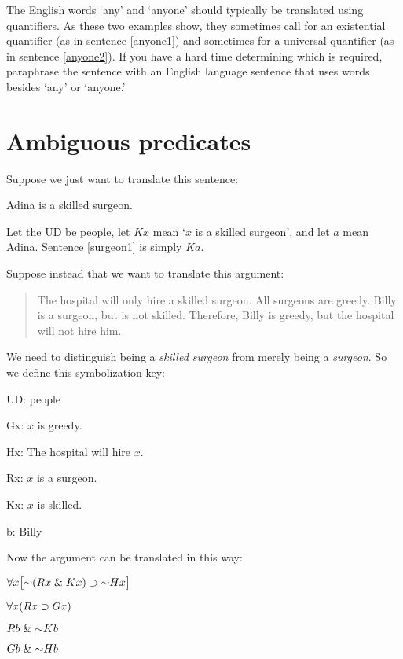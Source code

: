 The English words `any' and `anyone' should typically be translated using quantifiers. As these two examples show, they sometimes call for an existential quantifier (as in sentence \ref{anyone1}) and sometimes for a universal quantifier (as in sentence \ref{anyone2}). If you have a hard time determining which is required, paraphrase the sentence with an English language sentence that uses words besides `any' or `anyone.'



\section{Ambiguous predicates}

Suppose we just want to translate this sentence:
\begin{earg}
\item[\ex{surgeon1}] Adina is a skilled surgeon.
\end{earg}
Let the UD be people, let $Kx$ mean `$x$ is a skilled surgeon', and let $a$ mean Adina. Sentence \ref{surgeon1} is simply $Ka$.


Suppose instead that we want to translate this argument:
\begin{quote}
The hospital will only hire a skilled surgeon. All surgeons are greedy. Billy is a surgeon, but is not skilled. Therefore, Billy is greedy, but the hospital will not hire him.
\end{quote}
We need to distinguish being a \emph{skilled surgeon} from merely being a \emph{surgeon}. So we define this symbolization key:
\begin{ekey}
\item[UD:] people
\item[Gx:] $x$ is greedy.
\item[Hx:] The hospital will hire $x$.
\item[Rx:] $x$ is a surgeon.
\item[Kx:] $x$ is skilled.
\item[b:] Billy
\end{ekey}

Now the argument can be translated in this way:
\begin{earg}
\label{surgeon2}
\item[] $\qt{\forall}{x}\bigl[\enot (Rx \eand Kx) \eif \enot Hx\bigr]$
\item[] $\forall x(Rx \supset Gx)$
\item[] $Rb \eand \enot Kb$
\item[\therefore] $Gb \eand \enot Hb$
\end{earg}

